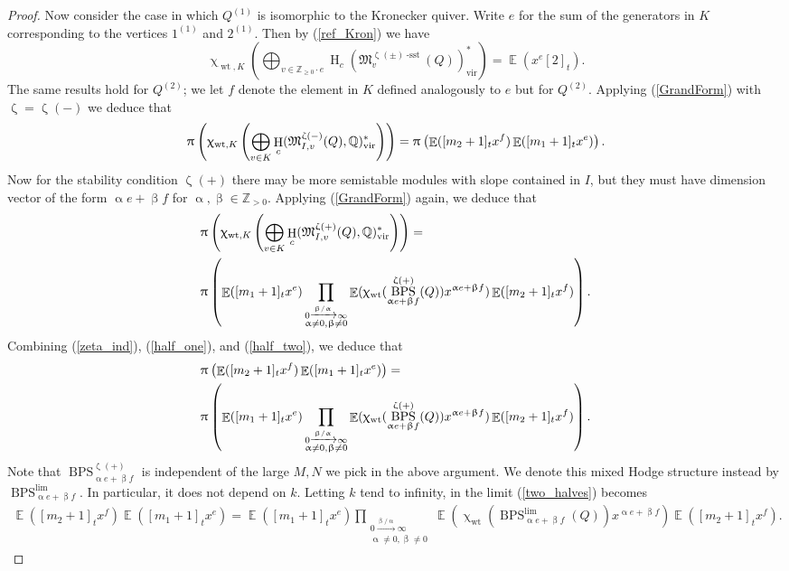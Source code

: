 \documentclass{amsart}
\newcommand{\Mst}{\mathfrak{M}}
\DeclareMathOperator{\Wt}{wt}
\DeclareMathOperator{\HO}{H}
\DeclareMathOperator{\sstable}{-sst}
\DeclareMathOperator{\BPS}{BPS}
\DeclareMathOperator{\vir}{vir}
\DeclareMathOperator{\EE}{\mathbb{E}}
\renewcommand{\alpha}{\upalpha}
\renewcommand{\beta}{\upbeta}
\renewcommand{\zeta}{\upzeta}
\renewcommand{\pi}{\uppi\hspace{0.05em}}
\renewcommand{\chi}{\upchi}
\theoremstyle{plain}%
\theoremstyle{definition}
\theoremstyle{remark}
\begin{document}
\begin{proof}
Now consider the case in which $Q^{(1)}$ is isomorphic to the Kronecker quiver.  Write $e$ for the sum of the generators in $K$ corresponding to the vertices $1^{(1)}$ and $2^{(1)}$.  Then by (\ref{ref_Kron}) we have
\[
\chi_{\Wt,K}\left(\bigoplus_{v\in \mathbb{Z}_{\geq 0}\cdot e}\HO_c(\Mst^{\zeta(\pm)\sstable}_{v}(Q))_{\vir}^*\right)=\EE(x^{e}[2]_t).
\]
The same results hold for $Q^{(2)}$; we let $f$ denote the element in $K$ defined analogously to $e$ but for $Q^{(2)}$.  Applying (\ref{GrandForm}) with $\zeta=\zeta(-)$ we deduce that
\begin{equation}
\label{half_one}    
\pi\left(\chi_{\Wt,K}\left(\bigoplus_{v\in K}\HO_c(\Mst^{\zeta(-)}_{I,v}(Q),\mathbb{Q})^*_{\vir}\right)\right)=\pi\left(\EE([m_2+1]_tx^f)\EE([m_1+1]_tx^e)\right).
\end{equation}
Now for the stability condition $\zeta(+)$ there may be more semistable modules with slope contained in $I$, but they must have dimension vector of the form $\alpha e+\beta f$ for $\alpha,\beta\in \mathbb{Z}_{>0}$.  Applying (\ref{GrandForm}) again, we deduce that 
\begin{align}
\label{half_two}
&\pi\left(\chi_{\Wt,K}\left(\bigoplus_{v\in K}\HO_c(\Mst^{\zeta(+)}_{I,v}(Q),\mathbb{Q})^*_{\vir}\right)\right)=\\&\pi\left(\EE([m_1+1]_tx^e)\prod_{\substack{0\xrightarrow{\beta/\alpha}\infty\\\alpha\neq 0,\beta\neq 0}}\EE(\chi_{\Wt}(\BPS^{\zeta(+)}_{\alpha e+\beta f}(Q))x^{\alpha e+\beta f}) \EE([m_2+1]_tx^f)\right).\nonumber
\end{align}
Combining (\ref{zeta_ind}), (\ref{half_one}), and (\ref{half_two}), we deduce that 
\begin{align}
\label{two_halves}
&\pi\left(\EE([m_2+1]_tx^f)\EE([m_1+1]_tx^e)\right)=\\&\pi\left(\EE([m_1+1]_tx^e)\prod_{\substack{0\xrightarrow{\beta/\alpha}\infty\\\alpha\neq 0,\beta\neq 0}}\EE(\chi_{\Wt}(\BPS^{\zeta(+)}_{\alpha e+\beta f}(Q))x^{\alpha e+\beta f})\nonumber \EE([m_2+1]_tx^f)\right).
\end{align}
Note that $\BPS_{\alpha e+\beta f}^{\zeta(+)}$ is independent of the large $M,N$ we pick in the above argument.  We denote this mixed Hodge structure instead by $\BPS_{\alpha e+\beta f}^{\lim}$.  In particular, it does not depend on $k$.  Letting $k$ tend to infinity, in the limit (\ref{two_halves}) becomes
\begin{align}
\label{two_halves_two}
\EE([m_2+1]_tx^f)\EE([m_1+1]_tx^e)=\EE([m_1+1]_tx^e)\prod_{\substack{0\xrightarrow{\beta/\alpha}\infty\\\alpha\neq 0,\beta\neq 0}}\EE(\chi_{\Wt}(\BPS^{\lim}_{\alpha e+\beta f}(Q))x^{\alpha e+\beta f}) \EE([m_2+1]_tx^f).
\end{align}


\end{proof}
\end{document}
